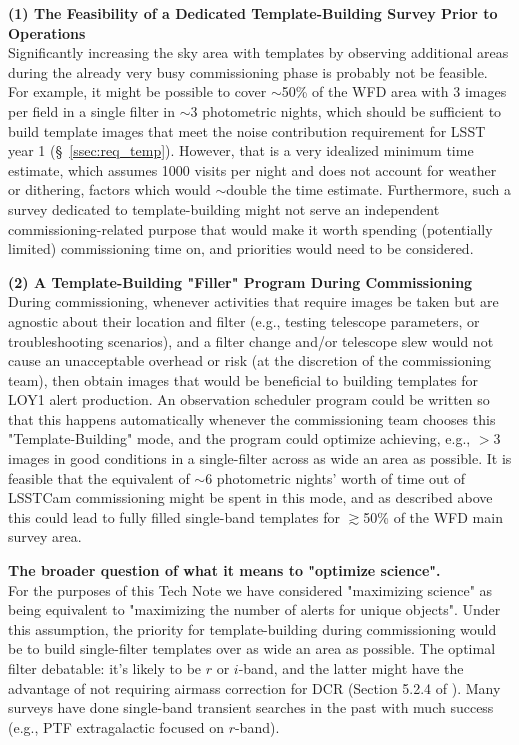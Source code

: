 \documentclass[DM,toc]{lsstdoc}
\begin{document}
{\bf (1) The Feasibility of a Dedicated Template-Building Survey Prior to Operations}\\
Significantly increasing the sky area with templates by observing additional areas during the already very busy commissioning phase is probably not be feasible.
For example, it might be possible to cover $\sim$50\% of the WFD area with $3$ images per field in a single filter in $\sim$3 photometric nights, which should be sufficient to build template images that meet the noise contribution requirement for LSST year 1 (\S~\ref{ssec:req_temp}).
However, that is a very idealized minimum time estimate, which assumes 1000 visits per night and does not account for weather or dithering, factors which would $\sim$double the time estimate.
Furthermore, such a survey dedicated to template-building might not serve an independent commissioning-related purpose that would make it worth spending (potentially limited) commissioning time on, and priorities would need to be considered.

{\bf (2) A Template-Building "Filler" Program During Commissioning}\\
During commissioning, whenever activities that require images be taken but are agnostic about their location and filter (e.g., testing telescope parameters, or troubleshooting scenarios), and a filter change and/or telescope slew would not cause an unacceptable overhead or risk (at the discretion of the commissioning team), then obtain images that would be beneficial to building templates for LOY1 alert production.
An observation scheduler program could be written so that this happens automatically whenever the commissioning team chooses this "Template-Building" mode, and the program could optimize achieving, e.g., $>$3 images in good conditions in a single-filter across as wide an area as possible.
It is feasible that the equivalent of $\sim$6 photometric nights' worth of time out of LSSTCam commissioning might be spent in this mode, and as described above this could lead to fully filled single-band templates for $\gtrsim$50\% of the WFD main survey area.

{\bf The broader question of what it means to "optimize science".} \\
For the purposes of this Tech Note we have considered "maximizing science" as being equivalent to "maximizing the number of alerts for unique objects".
Under this assumption, the priority for template-building during commissioning would be to build single-filter templates over as wide an area as possible.
The optimal filter debatable: it's likely to be $r$ or $i$-band, and the latter might have the advantage of not requiring airmass correction for DCR (Section 5.2.4 of ).
Many surveys have done single-band transient searches in the past with much success (e.g., PTF extragalactic focused on $r$-band). 
\end{document}
